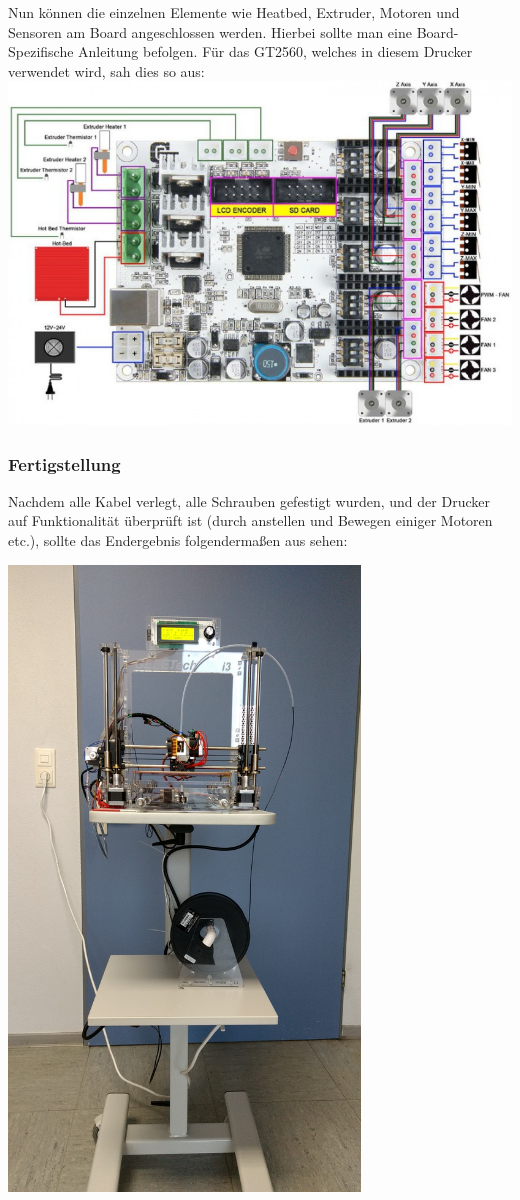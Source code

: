 Nun können die einzelnen Elemente wie Heatbed, Extruder, Motoren und Sensoren am Board angeschlossen werden. Hierbei sollte man eine Board-Spezifische Anleitung befolgen. Für das GT2560, welches in diesem Drucker verwendet wird, sah dies so aus:\\
\includegraphics[width=\textwidth]{Bilder/Electronics_2.jpg}

\newpage
\subsubsection{Fertigstellung}
Nachdem alle Kabel verlegt, alle Schrauben gefestigt wurden, und der Drucker auf Funktionalität überprüft ist (durch anstellen und Bewegen einiger Motoren etc.), sollte das Endergebnis folgendermaßen aus sehen:\\
\begin{center}
\includegraphics[width=0.7\textwidth]{Bilder/Tutorial/IMG_20161101_143059461.jpg}
\end{center}
